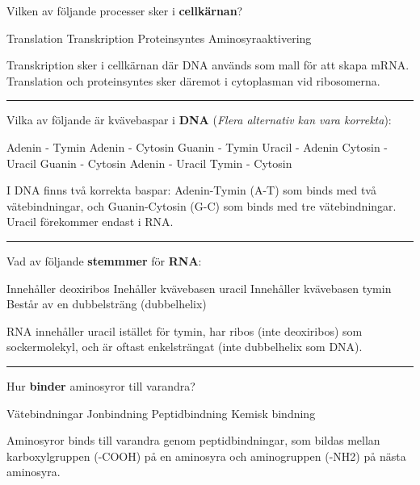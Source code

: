 \documentclass{exam}
\begin{document}
\begin{questions}
\question Vilken av följande processer sker i \textbf{cellkärnan}?
\begin{checkboxes}
\choice Translation
\correctchoice Transkription
\choice Proteinsyntes
\choice Aminosyraaktivering
\end{checkboxes}
\begin{solution}
Transkription sker i cellkärnan där DNA används som mall för att skapa mRNA. Translation och proteinsyntes sker däremot i cytoplasman vid ribosomerna.
\end{solution}

\vspace{5mm}
\hrule
\vspace{5mm}

\question Vilka av följande är kvävebaspar i \textbf{DNA} (\textit{Flera alternativ kan vara korrekta}):
\begin{checkboxes}
\correctchoice Adenin - Tymin
\choice Adenin - Cytosin
\choice Guanin - Tymin
\choice Uracil - Adenin
\choice Cytosin - Uracil
\correctchoice Guanin - Cytosin
\choice Adenin - Uracil
\choice Tymin - Cytosin
\end{checkboxes}
\begin{solution}
I DNA finns två korrekta baspar: Adenin-Tymin (A-T) som binds med två vätebindningar, och Guanin-Cytosin (G-C) som binds med tre vätebindningar. Uracil förekommer endast i RNA.
\end{solution}

\vspace{5mm}
\hrule
\vspace{5mm}

\question Vad av följande \textbf{stemmmer} för \textbf{RNA}:
\begin{checkboxes}
   \choice Innehåller deoxiribos
   \correctchoice Inehåller kvävebasen uracil
   \choice Innehåller kvävebasen tymin
   \choice Består av en dubbelsträng (dubbelhelix)
\end{checkboxes}
\begin{solution}
RNA innehåller uracil istället för tymin, har ribos (inte deoxiribos) som sockermolekyl, och är oftast enkelsträngat (inte dubbelhelix som DNA).
\end{solution}

\vspace{5mm}
\hrule
\vspace{5mm}

\question Hur \textbf{binder} aminosyror till varandra?
\begin{checkboxes}
   \choice Vätebindningar
   \choice Jonbindning
   \correctchoice Peptidbindning
   \choice Kemisk bindning
\end{checkboxes}
\begin{solution}
Aminosyror binds till varandra genom peptidbindningar, som bildas mellan karboxylgruppen (-COOH) på en aminosyra och aminogruppen (-NH2) på nästa aminosyra.
\end{solution}


\end{questions}
\end{document}

